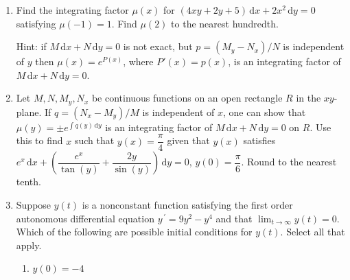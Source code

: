 \documentclass{ximera}
\begin{document}
\begin{enumerate}[label=(\arabic*)]



\item Find the integrating factor $\mu (x)$ for $(4xy+2y+5)\,\mathrm{d}x+ 2x^2\,\mathrm{d}y=0$ satisfying $\mu(-1)=1$.  Find $\mu(2)$ to the nearest hundredth.

Hint:  if $M\,\mathrm{d}x+N\,\mathrm{d}y=0$ is not exact, but $p=(M_{y}-N_{x})/N$ is independent of $y$ then $\displaystyle \mu (x)= e^{P(x)}$, where $P'(x)=p(x)$, is an integrating factor of $M\,\mathrm{d}x+N\,\mathrm{d}y=0$.




\newpage

\item Let $M,N,M_{y},N_{x}$ be continuous functions on an open rectangle $R$ in the $xy$-plane.  If $q=(N_{x}-M_{y})/M$ is independent of $x$, one can show that $\displaystyle \mu (y)=\pm e^{\int q(y)\,\mathrm{d}y}$ is an integrating factor of $M\,\mathrm{d}x+N\,\mathrm{d}y=0$ on $R$.  Use this to find $x$ such that $y(x)=\dfrac{\pi}{4}$ given that $y(x)$ satisfies\\ $e^x \,\mathrm{d}x+\left(\dfrac{e^x}{\tan{(y)}}+\dfrac{2y}{\sin{(y)}}\right)\,\mathrm{d}y=0$, $y(0)=\dfrac{\pi}{6}$.  Round to the nearest tenth.




\item Suppose $y(t)$ is a nonconstant function satisfying the first order autonomous differential equation $\displaystyle y^{\,\prime}=9y^2-y^4$ and that $\displaystyle \lim_{t\rightarrow \infty}y(t)=0$.  Which of the following are possible initial conditions for $y(t)$.  Select all that apply.



\begin{enumerate}[label=(\alph*)]
\item $y(0)=-4$


\end{enumerate}
\end{enumerate}
\end{document}
